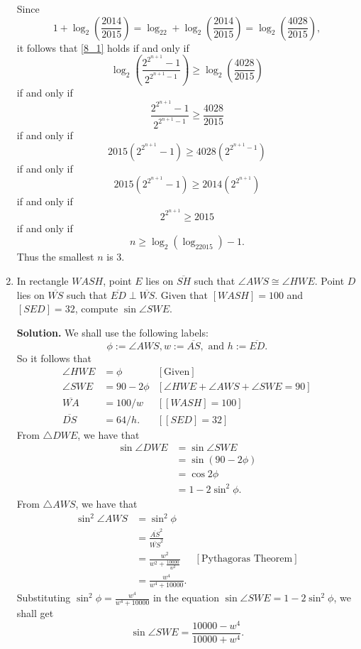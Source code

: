 \documentclass[9pt]{article}
\newcommand{\D}{\displaystyle}
\begin{document}
\begin{enumerate}
      Since
      $$1 + \log_2\left(\frac{2014}{2015}\right) = 
        \log_22 + \log_2\left(\frac{2014}{2015}\right) =
              \log_2\left(\frac{4028}{2015}\right),$$
      it follows that \eqref{8_1} holds if and only if
      $$
         \log_2\left(\frac{2^{2^{n+1}} - 1}{2^{2^{n+1}-1}}\right) \ge
            \log_2\left(\frac{4028}{2015}\right)
      $$
      if and only if
      $$\frac{2^{2^{n+1}} - 1}{2^{2^{n+1}-1}} \ge \frac{4028}{2015}$$
      if and only if
      $$2015(2^{2^{n+1}}-1) \ge 4028(2^{2^{n+1}-1})$$
      if and only if
      $$2015(2^{2^{n+1}}-1) \ge 2014(2^{2^{n+1}})$$
      if and only if
      $$2^{2^{n+1}} \ge 2015$$
      if and only if
      $$n \ge \log_2(\log_22015) - 1.$$
      Thus the smallest $n$ is 3.
   \item In rectangle $WASH$, point $E$ lies on $\overline{SH}$ such that
         $\angle AWS \cong \angle HWE$. Point $D$ lies on $\overline{WS}$ such
         that $\overline{ED} \perp \overline{WS}$. Given that $[WASH] = 100$ and
         $[SED] = 32$, compute $\sin \angle SWE$.

      \textbf{Solution.} We shall use the following labels:
      $$\phi := \angle AWS, w := \overline{AS},\text{ and } h :=\overline{ED}.$$
      So it follows that
      \begin{align*}      
         \angle HWE &= \phi &[\text{Given}] \\
         \angle SWE &= 90 - 2\phi &[\angle HWE + \angle AWS + \angle SWE = 90]\\
         \overline{WA} &= 100 / w &[[WASH] = 100] \\
         \overline{DS} &= 64 / h. &[[SED] = 32]
      \end{align*}
      From $\triangle DWE$, we have that
      \begin{align*}
         \sin \angle DWE &= \sin \angle SWE \\
            &= \sin(90 - 2\phi) \\
            &= \cos2\phi \\
            &= 1 - 2\sin^2\phi.
      \end{align*}
      From $\triangle AWS$, we have that
      \begin{align*}
         \sin^2 \angle AWS &= \sin^2 \phi \\
            &= \frac{\overline{AS}^2}{\overline{WS}^2} \\
            &= \frac{w^2}{w^2 + \D\frac{10000}{w^2}}
                  &[\text{Pythagoras Theorem}] \\
            &= \frac{w^4}{w^4+10000}.
      \end{align*}
      Substituting $\sin^2 \phi = \D\frac{w^4}{w^4+10000}$ in the equation 
      $\sin \angle SWE = 1 - 2\sin^2\phi$, we shall get
      \begin{equation} \label{9_1}
         \sin \angle SWE = \frac{10000 - w^4}{10000 + w^4}.
      \end{equation}


\end{enumerate}
\end{document}
